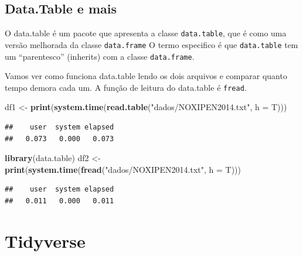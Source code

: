 \documentclass[]{book}
\newenvironment{Shaded}{\begin{snugshade}}{\end{snugshade}}
\newcommand{\KeywordTok}[1]{\textcolor[rgb]{0.13,0.29,0.53}{\textbf{#1}}}
\newcommand{\DataTypeTok}[1]{\textcolor[rgb]{0.13,0.29,0.53}{#1}}
\newcommand{\StringTok}[1]{\textcolor[rgb]{0.31,0.60,0.02}{#1}}
\newcommand{\NormalTok}[1]{#1}
\theoremstyle{definition}
\theoremstyle{definition}
\theoremstyle{definition}
\theoremstyle{remark}
\begin{document}
\subsection{Data.Table e mais}\label{data.table-e-mais}

O data.table é um pacote que apresenta a classe \texttt{data.table}, que
é como uma versão melhorada da classe \texttt{data.frame} O termo
especifico é que \texttt{data.table} tem um ``parentesco'' (inherits)
com a classe \texttt{data.frame}.

Vamos ver como funciona data.table lendo os dois arquivos e comparar
quanto tempo demora cada um. A função de leitura do data.table é
\texttt{fread}.

\begin{Shaded}
\begin{Highlighting}[]
\NormalTok{df1 <-}\StringTok{ }\KeywordTok{print}\NormalTok{(}\KeywordTok{system.time}\NormalTok{(}\KeywordTok{read.table}\NormalTok{(}\StringTok{"dados/NOXIPEN2014.txt"}\NormalTok{, }\DataTypeTok{h =}\NormalTok{ T)))}
\end{Highlighting}
\end{Shaded}

\begin{verbatim}
##    user  system elapsed 
##   0.073   0.000   0.073
\end{verbatim}

\begin{Shaded}
\begin{Highlighting}[]
\KeywordTok{library}\NormalTok{(data.table)}
\NormalTok{df2 <-}\StringTok{ }\KeywordTok{print}\NormalTok{(}\KeywordTok{system.time}\NormalTok{(}\KeywordTok{fread}\NormalTok{(}\StringTok{"dados/NOXIPEN2014.txt"}\NormalTok{, }\DataTypeTok{h =}\NormalTok{ T)))}
\end{Highlighting}
\end{Shaded}

\begin{verbatim}
##    user  system elapsed 
##   0.011   0.000   0.011
\end{verbatim}

\hypertarget{tidyverse}{\section{Tidyverse}\label{tidyverse}}
\end{document}
